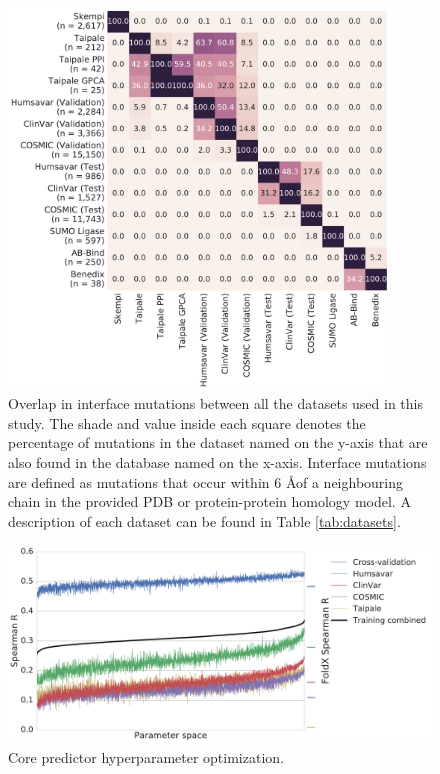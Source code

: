 \begin{figure}[tb]
	\centering
	\includegraphics[width=0.9\textwidth]{static/elaspic_training_set/data_statistics/training_set_overlap_data_df_tt_interface.pdf}
	\caption[Overlap in interface mutation datasets.]{
    Overlap in interface mutations between all the datasets used in this study.
    The shade and value inside each square denotes the percentage of mutations in the dataset named on the y-axis that are also found in the database named on the x-axis.
    Interface mutations are defined as mutations that occur within 6 \AA of a neighbouring chain in the provided PDB or protein-protein homology model.
    A description of each dataset can be found in Table \ref{tab:datasets}.
    }
    \label{fig:training_set_overlap_interface}
\end{figure}



\clearpage

\begin{figure}[tb]
	\includegraphics[width=0.9\linewidth]{static/elaspic_training_set/machine_learning/gridsearch_core.pdf}
	\caption[Core predictor hyperparameter optimization.]{Core predictor hyperparameter optimization.}
	\label{fig:gridsearch_core}
\end{figure}

